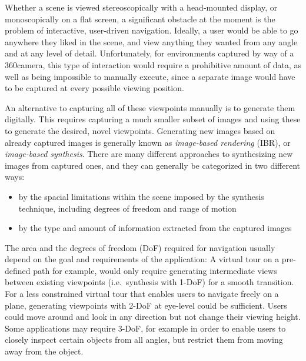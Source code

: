 Whether a scene is viewed stereoscopically with a head-mounted display, or monoscopically on a flat screen, a significant obstacle at the moment is the problem of interactive, user-driven navigation. Ideally, a user would be able to go anywhere they liked in the scene, and view anything they wanted from any angle and at any level of detail. Unfortunately, for environments captured by way of a 360\degree camera, this type of interaction would require a prohibitive amount of data, as well as being impossible to manually execute, since a separate image would have to be captured at every possible viewing position.
\newpage

An alternative to capturing all of these viewpoints manually is to generate them digitally. This requires capturing a much smaller subset of images and using these to generate the desired, novel viewpoints. Generating new images based on already captured images is generally known as \emph{image-based rendering} (IBR), or \emph{image-based synthesis}. There are many different approaches to synthesizing new images from captured ones, and they can generally be categorized in two different ways:
\begin{itemize}
  \item by the spacial limitations within the scene imposed by the synthesis technique, including degrees of freedom and range of motion
  \item by the type and amount of information extracted from the captured images
\end{itemize}

The area and the degrees of freedom (DoF) required for navigation usually depend on the goal and requirements of the application: A virtual tour on a pre-defined path for example, would only require generating intermediate views between existing viewpoints (i.e.\ synthesis with 1-DoF) for a smooth transition. For a less constrained virtual tour that enables users to navigate freely on a plane, generating viewpoints with 2-DoF at eye-level could be sufficient. Users could move around and look in any direction but not change their viewing height. Some applications may require 3-DoF, for example in order to enable users to closely inspect certain objects from all angles, but restrict them from moving away from the object.

